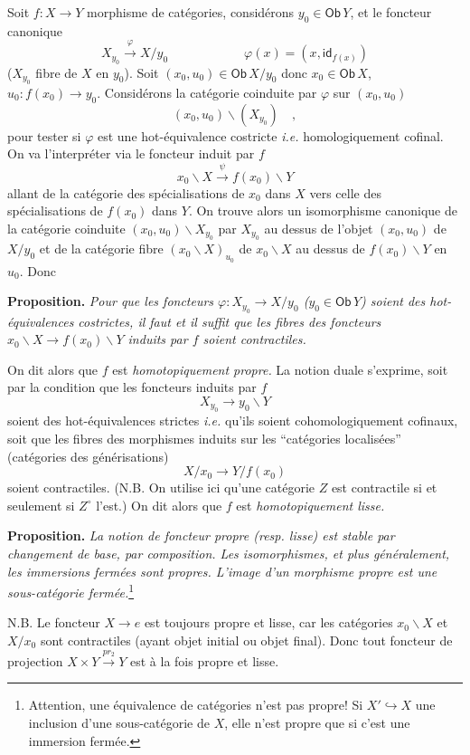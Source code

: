 \documentclass[11pt]{article}
\newcommand{\msp}[1]{\marginpar{\footnotesize [#1]}}
\newcommand{\Ob}{\mathsf{Ob}}
\newcommand{\id}{\mathsf{id}}
\begin{document}
\noindent Soit $f : X \to Y$ morphisme de catégories, considérons $y_0 \in \Ob\, Y$, et le foncteur canonique
\[
X_{y_0} \xrightarrow{\varphi} X/y_0 \qquad\qquad\qquad \varphi(x) = (x, \id_{f(x)}) \tag*{(1)}
\]
($X_{y_0}$ fibre de $X$ en $y_0$). Soit $(x_0, u_0) \in \Ob\, X/y_0$ donc $x_0 \in \Ob\, X$, $u_0 : f(x_0) \to y_0$. Considérons la catégorie coinduite par $\varphi$ sur $(x_0, u_0)$
\[
(x_0, u_0)\backslash(X_{y_0}) \quad ,
\]
pour tester si $\varphi$ est une hot-équivalence costricte \textit{i.e.} homologiquement cofinal. On va l'interpréter via le foncteur induit par $f$
\[
x_0\backslash X \xrightarrow{\psi} f(x_0)\backslash Y
\]
allant de la catégorie des spécialisations de $x_0$ dans $X$ vers celle des spécialisations de $f(x_0)$ dans $Y$. On trouve alors un isomorphisme canonique de la catégorie coinduite $(x_0, u_0)\backslash X_{y_0}$ par $X_{y_0}$ au dessus de l'objet $(x_0, u_0)$ de $X/y_0$ et de la catégorie fibre $(x_0\backslash X)_{u_0}$ de $x_0\backslash X$ au dessus de $f(x_0)\backslash Y$ en $u_0$. Donc

\noindent\textbf{Proposition.} \textit{Pour que les foncteurs $\varphi : X_{y_0} \to X/y_0$ ($y_0 \in \Ob\, Y$) soient des hot-équivalences costrictes, il faut et il suffit que les fibres des foncteurs $x_0\backslash X \to f(x_0)\backslash Y$ induits par $f$ soient contractiles.}

\noindent\msp{page 54}
On dit alors que $f$ est \textit{homotopiquement propre.} La notion duale s'exprime, soit par la condition que les foncteurs induits par $f$
\[
X_{y_0} \longrightarrow y_0\backslash Y
\]
soient des hot-équivalences strictes \textit{i.e.} qu'ils soient cohomologiquement cofinaux, soit que les fibres des morphismes induits sur les ``catégories localisées'' (catégories des générisations)
\[
X/x_0 \longrightarrow Y/f(x_0)
\]
soient contractiles. (N.B. On utilise ici qu'une catégorie $Z$ est contractile si et seulement si $Z^\circ$ l'est.) On dit alors que $f$ est \textit{homotopiquement lisse.}

\noindent\textbf{Proposition.} \textit{La notion de foncteur propre (resp. lisse) est stable par changement de base, par composition. Les isomorphismes, et plus généralement, les immersions fermées sont propres. L'image d'un morphisme propre est une sous-catégorie fermée.}\footnote[23]{Attention, une équivalence de catégories n'est pas propre! Si $X' \hookrightarrow X$ une inclusion d'une sous-catégorie de $X$, elle n'est propre que si c'est une immersion fermée.}

\noindent N.B. Le foncteur $X \to e$ est toujours propre et lisse, car les catégories $x_0\backslash X$ et $X/x_0$ sont contractiles (ayant objet initial ou objet final). Donc tout foncteur de projection $X \times Y \xrightarrow{pr_2} Y$ est à la fois propre et lisse.
\end{document}

